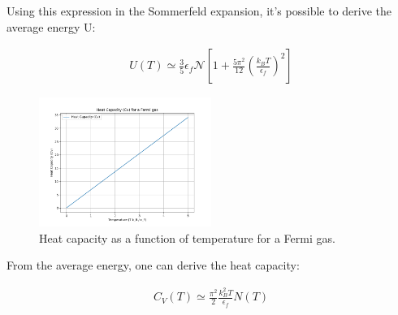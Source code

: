 \documentclass{article}
\begin{document}
Using this expression in the Sommerfeld expansion, it's possible to derive the average energy U:

\begin{tcolorbox}[colframe=gray!50, colback=gray!10, coltitle=black, title= $U(T>0)$]

    \begin{equation}
        \begin{aligned}
            U(T)\simeq \frac{3}{5}\epsilon_f\mathcal{N}\left[1+\frac{5\pi^2}{12}\left(\frac{k_BT}{\epsilon_f}\right)^2\right]
        \end{aligned}
    \end{equation}

\end{tcolorbox}

\begin{figure}[h]
    \centering
    \includegraphics[width=0.5\textwidth]{images/cv-fermions.png}
    \caption{Heat capacity as a function of temperature for a Fermi gas.}
    \label{fig:fermions-heat-capacity}
\end{figure}
From the average energy, one can derive the heat capacity:

\begin{tcolorbox}[colframe=gray!50, colback=gray!10, coltitle=black, title=$C_V(T>0)$]
    \begin{equation}
        \begin{aligned}
            C_V(T)\simeq \frac{\pi^2}{2}\frac{k_B^2T}{\epsilon_f}N(T)
        \end{aligned}
    \end{equation}
\end{tcolorbox}

\newpage
\end{document}
